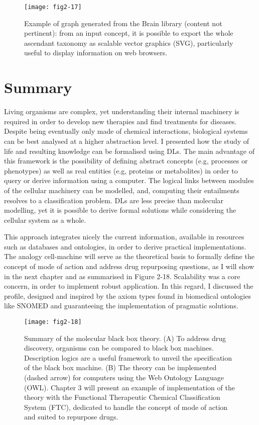 \begin{figure}[ht]
    \centering
    \texttt{[image: fig2-17]}
    \caption{Example of graph generated from the Brain library (content not pertinent): from an input concept, it is possible to export the whole ascendant taxonomy as scalable vector graphics (SVG), particularly useful to display information on web browsers.}
    \label{fig2-17}
\end{figure}

\section{Summary}

Living organisms are complex, yet understanding their internal machinery is required in order to develop new therapies and find treatments for diseases. Despite being eventually only made of chemical interactions, biological systems can be best analysed at a higher abstraction level. I presented how the study of life and resulting knowledge can be formalised using DLs. The main advantage of this framework is the possibility of defining abstract concepts (e.g, processes or phenotypes) as well as real entities (e.g, proteins or metabolites) in order to query or derive information using a computer. The logical links between modules of the cellular machinery can be modelled, and, computing their entailments resolves to a classification problem. DLs are less precise than molecular modelling, yet it is possible to derive formal solutions while considering the cellular system as a whole.

This approach integrates nicely the current information, available in resources such as databases and ontologies, in order to derive practical implementations. The analogy cell-machine will serve as the theoretical basis to formally define the concept of mode of action and address drug repurposing questions, as I will show in the next chapter and as summarised in Figure 2-18. Scalability was a core concern, in order to implement robust application. In this regard, I discussed the  profile, designed and inspired by the axiom types found in biomedical ontologies like SNOMED and guaranteeing the implementation of pragmatic solutions.

\begin{figure}[ht]
    \centering
    \texttt{[image: fig2-18]}
    \caption{Summary of the molecular black box theory. (A) To address drug discovery, organisms can be compared to black box machines. Description logics are a useful framework to unveil the specification of the black box machine. (B) The theory can be implemented (dashed arrow) for computers using the Web Ontology Language (OWL). Chapter 3 will present an example of implementation of the theory with the Functional Therapeutic Chemical Classification System (FTC), dedicated to handle the concept of mode of action and suited to repurpose drugs.}
    \label{fig2-18}
\end{figure}
